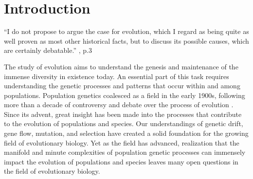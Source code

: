 \chapter{Introduction}
\label{chap:introduction}

\begin{quoteshrink}
  ``I do not propose to argue the case for evolution, which I regard as being quite as well proven as most other historical facts, but to discuss its possible causes, which are certainly debatable.''
  \hfill\citet{Haldane:1932}, p.3
\end{quoteshrink}

\noindent



The study of evolution aims to understand the genesis and maintenance of the immense diversity in existence today. An essential part of this task requires understanding the genetic processes and patterns that occur within and among populations. Population genetics coalesced as a field in the early 1900s, following more than a decade of controversy and debate over the process of evolution \citep{Provine:2001}. Since its advent, great insight has been made into the processes that contribute to the evolution of populations and species. Our understandings of genetic drift, gene flow, mutation, and selection have created a solid foundation for the growing field of evolutionary biology. Yet as the field has advanced, realization that the manifold and minute complexities of population genetic processes can immensely impact the evolution of populations and species leaves many open questions in the field of evolutionary biology.

